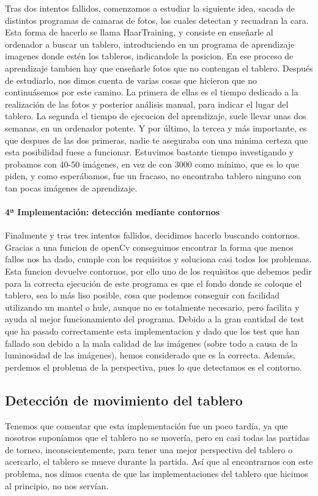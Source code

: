 \documentclass[12pt,a4paper]{report}
\begin{document}
Tras dos intentos fallidos, comenzamos a estudiar la siguiente idea, sacada de
distintos programas de camaras de fotos, los cuales detectan y recuadran la
cara. Esta forma de hacerlo se llama HaarTraining, y consiste en enseñarle al
ordenador a buscar un tablero, introduciendo en un programa de aprendizaje
imagenes donde estén los tableros, indicandole la posicion. En ese proceso de
aprendizaje tambien hay que enseñarle fotos que no contengan el tablero.
Después de estudiarlo, nos dimos cuenta de varias cosas que hicieron que no
continuásemos por este camino. La primera de ellas es el tiempo dedicado a la
realización de las fotos y posterior análisis manual, para indicar el lugar del
tablero. La segunda el tiempo de ejecucion del aprendizaje, suele llevar unas
dos semanas, en un ordenador potente. Y por último, la tercea y más importante,
es que despues de las dos primeras, nadie te aseguraba con una minima certeza 
que esta posibilidad fuese a funcionar. 
Estuvimos bastante tiempo investigando y probamos con 40-50 imágenes, en vez de
con 3000 como mínimo, que es lo que piden, y como esperábamos, fue un fracaso,
no encontraba tablero ninguno con tan pocas imágenes de aprendizaje. 


\paragraph{4ª Implementación: detección mediante contornos}

Finalmente y tras tres intentos fallidos, decidimos hacerlo buscando contornos.
Gracias a una funcion de openCv conseguimos encontrar la forma que menos fallos
nos ha dado, cumple con los requisitos y soluciona casi todos los problemas.
Esta funcion devuelve contornos, por ello uno de los requisitos que debemos
pedir para la correcta ejecución de este programa es que el fondo donde se
coloque el tablero, sea lo más liso posible, cosa que podemos conseguir con
facilidad utilizando un mantel o hule, aunque no es totalmente necesario, pero
facilita y ayuda al mejor funcionamiento del programa. Debido a la gran cantidad
de test que ha pasado correctamente esta implementacion y dado que los test que
han fallado son debido a la mala calidad de las imágenes (sobre todo a causa de
la luminosidad de las imágenes), hemos considerado que es la correcta. Además,
perdemos el problema de la perspectiva, pues lo que detectamos es el contorno.


\subsection{Detección de movimiento del tablero}
Tenemos que comentar que esta implementación fue un poco tardía, ya que nosotros
suponíamos que el tablero no se movería, pero en casi todas las partidas de
torneo, inconscientemente, para tener una mejor perspectiva del tablero o
acercarlo, el tablero se mueve durante la partida. Así que al encontrarnos con
este problema, nos dimos cuenta de que las implementaciones del tablero que
hicimos al principio, no nos servían. 
\end{document}
